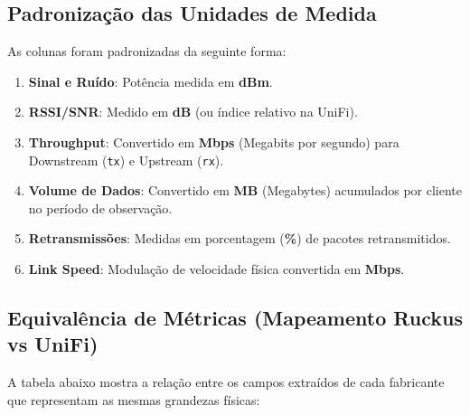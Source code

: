 \subsection{Padronização das Unidades de Medida}

As colunas foram padronizadas da seguinte forma:
\begin{enumerate}
  \item \textbf{Sinal e Ruído}: Potência medida em \textbf{dBm}.
  \item \textbf{RSSI/SNR}: Medido em \textbf{dB} (ou índice relativo na UniFi).
  \item \textbf{Throughput}: Convertido em \textbf{Mbps} (Megabits por segundo) para Downstream (\texttt{tx}) e Upstream (\texttt{rx}).
  \item \textbf{Volume de Dados}: Convertido em \textbf{MB} (Megabytes) acumulados por cliente no período de observação.
  \item \textbf{Retransmissões}: Medidas em porcentagem (\textbf{\%}) de pacotes retransmitidos.
  \item \textbf{Link Speed}: Modulação de velocidade física convertida em \textbf{Mbps}.

\end{enumerate}
\subsection{Equivalência de Métricas (Mapeamento Ruckus vs UniFi)}

A tabela abaixo mostra a relação entre os campos extraídos de cada fabricante que representam as mesmas grandezas físicas:

